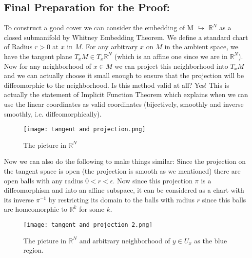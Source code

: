 \documentclass[12pt]{amsart}
\theoremstyle{remark}
\begin{document}
\subsection{Final Preparation for the Proof:}

\indent To construct a good cover we can consider the embedding of M $\hookrightarrow$ $\mathbb{R}^{N}$ as a closed submanifold by Whitney Embedding Theorem. We define a standard chart of Radius $r > 0$ at $x$ in $M$. For any arbitrary $x$ on $M$ in the ambient space, we have the tangent plane $T_x M \in T_x \mathbb{R}^N$ (which is an affine one since we are in $\mathbb{R}^N $). Now for any neighborhood of $x\in M$ we can project this neighborhood into $T_x M$ and we can actually choose it small enough to ensure that the projection will be diffeomorphic to the neighborhood. Is this method valid at all? Yes! This is actually the statement of Implicit Function Theorem which explains when we can use the linear coordinates as valid coordinates (bijectively, smoothly and inverse smoothly, i.e. diffeomorphically).

\begin{figure}[h]
    \centering
    \texttt{[image: tangent and projection.png]}
    \caption{The picture in $\mathbb{R}^N$}
    \label{fig:circles_interr}
\end{figure} 

\indent Now we can also do the following to make things similar: Since the projection on the tangent space is open (the projection is smooth as we mentioned) there are open balls with any radius $0 < r < \epsilon$. Now since this projection $\pi$ is a diffeomorphism and into an affine subspace, it can be considered as a chart with its inverse $\pi^{-1}$ by restricting its domain to the balls with radius $r$ since this balls are homeomorphic to $\mathbb{R}^k $ for some $k$. 

\begin{figure}[h]
    \centering
    \texttt{[image: tangent and projection 2.png]}
    \caption{The picture in $\mathbb{R}^N$ and arbitrary neighborhood of $y\in U_x$ as the blue region.}
    \label{fig:circles_interrrr}
\end{figure}
\end{document}
